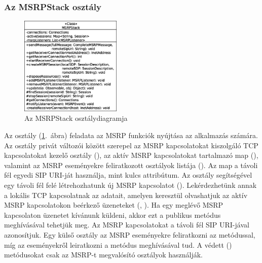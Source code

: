 \subsubsection*{Az MSRPStack osztály}
\label{sec:msrp_stack}

\begin{figure}
  \vspace{-15pt}
  \begin{center}
    \includegraphics[width=0.43\textwidth]{img/class_diagrams/MSRPStack.eps}
  \end{center}
  \vspace{-15pt}
  \captionsetup{font=scriptsize}
  \caption{Az MSRPStack osztálydiagramja}
  \label{fig:class_msrp_stack}
  \vspace{-10pt}
\end{figure}
Az  osztály (\ref{fig:class_msrp_stack}.~ábra) feladata az MSRP funkciók nyújtása az alkalmazás számára. Az osztály privát változói között szerepel az MSRP kapcsolatokat kiszolgáló TCP kapcsolatokat kezelő osztály (), az aktív MSRP kapcsolatokat tartalmazó map (), valamint az MSRP eseményekre feliratkozott osztályok listája (). Az  map a távoli fél egyedi SIP URI-ját használja, mint kulcs attribútum. Az osztály segítségével egy távoli fél felé létrehozhatunk új MSRP kapcsolatot (). Lekérdezhetünk annak a lokális TCP kapcsolatnak az adatait, amelyen keresztül olvashatjuk az aktív MSRP kapcsolatokon beérkező üzeneteket (, ). Ha egy meglévő MSRP kapcsolaton üzenetet kívánunk küldeni, akkor ezt a  publikus metódus meghívásával tehetjük meg. Az MSRP kapcsolatokat a távoli fél SIP URI-jával azonosítjuk. Egy külső osztály az MSRP eseményekre feliratkozni az  metódussal, míg az eseményekről leiratkozni a  metódus meghívásával tud. A védett () metódusokat csak az MSRP-t megvalósító osztályok használják.

